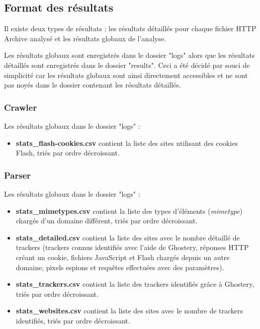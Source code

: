 \subsection{Format des résultats}
Il existe deux types de résultats : les résultats détaillés pour chaque fichier HTTP Archive analysé et les résultats globaux de l'analyse.

Les résultats globaux sont enregistrés dans le dossier "logs" alors que les résultats détaillés sont enregistrés dans le dossier "results".
Ceci a été décidé par souci de simplicité car les résultats globaux sont ainsi directement accessibles et ne sont pas noyés dans le dossier contenant les résultats détaillés.

\subsubsection{Crawler}
Les résultats globaux dans le dossier "logs" :
\begin{itemize}
	\item \textbf{stats\_flash-cookies.csv} contient la liste des sites utilisant des cookies Flash, triés par ordre décroissant.
\end{itemize}

\subsubsection{Parser}
Les résultats globaux dans le dossier "logs" :
\begin{itemize}
	\item \textbf{stats\_mimetypes.csv} contient la liste des types d'éléments (\textit{mimetype}) chargés d'un domaine différent, triés par ordre décroissant.
	\item \textbf{stats\_detailed.csv} contient la liste des sites avec le nombre détaillé de trackers (trackers connus identifiés avec l'aide de Ghostery, réponses HTTP créant un cookie, fichiers JavaScript et Flash chargés depuis un autre domaine, pixels espions et requêtes effectuées avec des paramètres).
	\item \textbf{stats\_trackers.csv} contient la liste des trackers identifiés grâce à Ghostery, triés par ordre décroissant.
	\item \textbf{stats\_websites.csv} contient la liste des sites avec le nombre de trackers identifiés, triés par ordre décroissant.
	\newline
\end{itemize}

